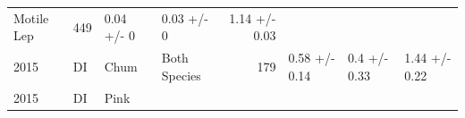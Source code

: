 \documentclass[fleqn,10pt]{wlpeerj} %
\begin{document}
\begin{longtable}[]{@{}llllrlll@{}}
\begin{minipage}[t]{0.11\columnwidth}
Motile Lep\strut
\end{minipage} & \begin{minipage}[t]{0.04\columnwidth}\raggedleft\strut
449\strut
\end{minipage} & \begin{minipage}[t]{0.14\columnwidth}\raggedright\strut
0.04 +/- 0\strut
\end{minipage} & \begin{minipage}[t]{0.14\columnwidth}\raggedright\strut
0.03 +/- 0\strut
\end{minipage} & \begin{minipage}[t]{0.14\columnwidth}\raggedright\strut
1.14 +/- 0.03\strut
\end{minipage}\tabularnewline
\begin{minipage}[t]{0.09\columnwidth}\raggedright\strut
2015\strut
\end{minipage} & \begin{minipage}[t]{0.06\columnwidth}\raggedright\strut
DI\strut
\end{minipage} & \begin{minipage}[t]{0.06\columnwidth}\raggedright\strut
Chum\strut
\end{minipage} & \begin{minipage}[t]{0.11\columnwidth}\raggedright\strut
Both Species\strut
\end{minipage} & \begin{minipage}[t]{0.04\columnwidth}\raggedleft\strut
179\strut
\end{minipage} & \begin{minipage}[t]{0.14\columnwidth}\raggedright\strut
0.58 +/- 0.14\strut
\end{minipage} & \begin{minipage}[t]{0.14\columnwidth}\raggedright\strut
0.4 +/- 0.33\strut
\end{minipage} & \begin{minipage}[t]{0.14\columnwidth}\raggedright\strut
1.44 +/- 0.22\strut
\end{minipage}\tabularnewline
\begin{minipage}[t]{0.09\columnwidth}\raggedright\strut
2015\strut
\end{minipage} & \begin{minipage}[t]{0.06\columnwidth}\raggedright\strut
DI\strut
\end{minipage} & \begin{minipage}[t]{0.06\columnwidth}\raggedright\strut
Pink\strut
\end{minipage} & \begin{minipage}[t]{0.11\columnwidth}\raggedright\strut

\end{minipage}
\end{longtable}
\end{document}
